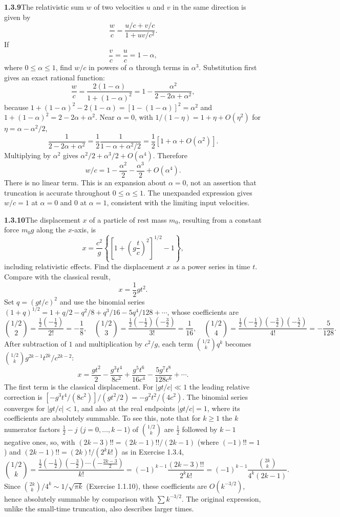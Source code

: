 \par\bigskip
\noindent\textbf{1.3.9}\quad The relativistic sum $w$ of two velocities $u$
and $v$ in the same direction is given by
\[
\frac{w}{c}=\frac{u/c+v/c}{1+uv/c^{2}}.
\]
If
\[
\frac{v}{c}=\frac{u}{c}=1-\alpha,
\]
where $0\leq\alpha\leq1$, find $w/c$ in powers of $\alpha$ through terms in
$\alpha^{3}$.
\solution
Substitution first gives an exact rational function:
\[
 \frac wc=\frac{2(1-\alpha)}{1+(1-\alpha)^2}
          =1-\frac{\alpha^2}{2-2\alpha+\alpha^2},
\]
because $1+(1-\alpha)^2-2(1-\alpha)=[1-(1-\alpha)]^2=\alpha^2$ and
$1+(1-\alpha)^2=2-2\alpha+\alpha^2$.
Near $\alpha=0$, with $1/(1-\eta)=1+\eta+O(\eta^2)$ for
$\eta=\alpha-\alpha^2/2$,
\[
 \frac1{2-2\alpha+\alpha^2}
 =\frac12\frac1{1-\alpha+\alpha^2/2}
 =\frac12[1+\alpha+O(\alpha^2)].
\]
Multiplying by $\alpha^2$ gives $\alpha^2/2+\alpha^3/2+O(\alpha^4)$.
Therefore
\[
 \boxed{w/c=1-\frac{\alpha^2}{2}-\frac{\alpha^3}{2}+O(\alpha^4)}.
\]
There is no linear term. This is an expansion about $\alpha=0$,
not an assertion that truncation is accurate throughout $0\le\alpha\le1$.
The unexpanded expression gives $w/c=1$ at $\alpha=0$ and $0$ at
$\alpha=1$, consistent with the limiting input velocities.


\par\bigskip
\noindent\textbf{1.3.10}\quad The displacement $x$ of a particle of rest mass
$m_{0}$, resulting from a constant force $m_{0}g$ along the $x$-axis, is
\[
x=\frac{c^{2}}{g}\left\{\left[1+\left(g\frac{t}{c}\right)^{2}\right]^{1/2}-1\right\},
\]
including relativistic effects. Find the displacement $x$ as a power series in
time $t$. Compare with the classical result,
\[
x=\frac{1}{2}gt^{2}.
\]
\solution
Set $q=(gt/c)^2$ and use the binomial series
$(1+q)^{1/2}=1+q/2-q^2/8+q^3/16-5q^4/128+\cdots$, whose coefficients are
\[
 \binom{1/2}2=\frac{\frac12(-\frac12)}{2!}=-\frac18,\quad
 \binom{1/2}3=\frac{\frac12(-\frac12)(-\frac32)}{3!}=\frac1{16},\quad
 \binom{1/2}4=\frac{\frac12(-\frac12)(-\frac32)(-\frac52)}{4!}
 =-\frac5{128}.
\]
After subtraction of $1$ and multiplication by $c^2/g$, each term
$\binom{1/2}kq^k$ becomes $\binom{1/2}k g^{2k-1}t^{2k}/c^{2k-2}$:
\[
 \boxed{x=\frac{gt^2}{2}-\frac{g^3t^4}{8c^2}
              +\frac{g^5t^6}{16c^4}-\frac{5g^7t^8}{128c^6}+\cdots}.
\]
The first term is the classical displacement. For $|gt/c|\ll1$ the
leading relative correction is
$[-g^3t^4/(8c^2)]/(gt^2/2)=-g^2t^2/(4c^2)$.
The binomial series converges for $|gt/c|<1$, and also at the real
endpoints $|gt/c|=1$, where its coefficients are absolutely summable.
To see this, note that for $k\ge1$ the $k$ numerator factors $\frac12-j$
($j=0,\ldots,k-1$) of $\binom{1/2}k$ are $\frac12$ followed by $k-1$
negative ones, so, with $(2k-3)!!=(2k-1)!!/(2k-1)$ (where $(-1)!!=1$) and
$(2k-1)!!=(2k)!/(2^kk!)$ as in Exercise 1.3.4,
\[
 \binom{1/2}k=\frac{\frac12(-\frac12)(-\frac32)\cdots(-\frac{2k-3}2)}{k!}
 =(-1)^{k-1}\frac{(2k-3)!!}{2^kk!}
 =(-1)^{k-1}\frac{\binom{2k}k}{4^k(2k-1)}.
\]
Since $\binom{2k}k/4^k\sim1/\sqrt{\pi k}$ (Exercise 1.1.10), these
coefficients are $O(k^{-3/2})$, hence absolutely summable by comparison
with $\sum k^{-3/2}$. The original expression, unlike the small-time
truncation, also describes larger times.


